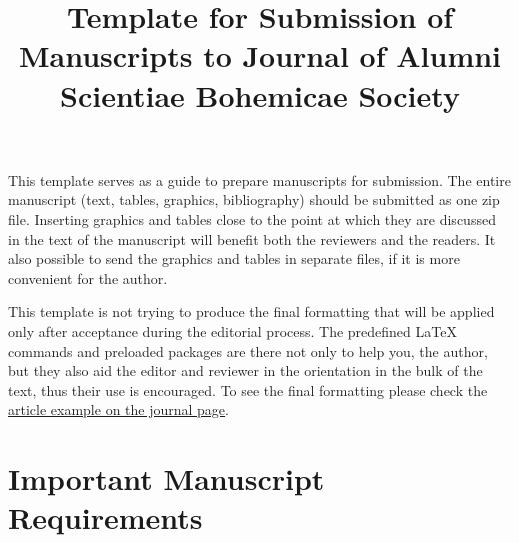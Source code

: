 \documentclass[english]{jasb}
\title{Template for Submission of Manuscripts to Journal of Alumni Scientiae Bohemicae Society}
\date{}
\begin{document}
   \maketitle 
   This template serves as a guide to prepare manuscripts for submission. The entire manuscript (text, tables, graphics, bibliography) should be submitted as one zip file. Inserting graphics and tables close to the point at which they are discussed in the text of the manuscript will benefit both the reviewers and the readers. It also possible to send the graphics and tables in separate files, if it is more convenient for the author.

This template is not trying to produce the final formatting that will be applied only after acceptance during the editorial process. The predefined \LaTeX{} commands and preloaded packages are there not only to help you, the author, but they also aid the editor and reviewer in the orientation in the bulk of the text, thus their use is encouraged. To see the final formatting please check the \href{http://journal.asbsociety.com/articles/}{article example on the journal page}.
\section*{Important Manuscript Requirements}
\end{document}
